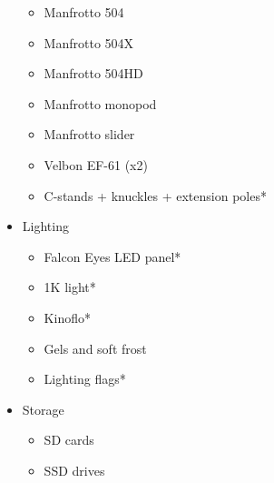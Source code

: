 \documentclass[]{article}
\begin{document}
\begin{itemize}
\begin{itemize}
              \item Manfrotto 504
              \item Manfrotto 504X
              \item Manfrotto 504HD
              \item Manfrotto monopod
              \item Manfrotto slider
              \item Velbon EF-61 (x2)
              \item C-stands + knuckles + extension poles*
          \end{itemize}
    \item Lighting
          \begin{itemize}
              \item Falcon Eyes LED panel*
              \item 1K light*
              \item Kinoflo*
              \item Gels and soft frost
              \item Lighting flags*
          \end{itemize}
    \item Storage
          \begin{itemize}
              \item SD cards
              \item SSD drives
          \end{itemize}
\end{itemize}
\end{document}
